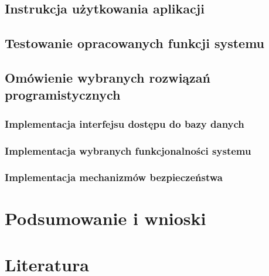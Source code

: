 \documentclass[12pt]{article}
\begin{document}
\subsection{Instrukcja użytkowania aplikacji}
\subsection{Testowanie opracowanych funkcji systemu}
\subsection{Omówienie wybranych rozwiązań programistycznych}
\subsubsection{Implementacja interfejsu dostępu do bazy danych}
\subsubsection{Implementacja wybranych funkcjonalności systemu}
\subsubsection{Implementacja mechanizmów bezpieczeństwa}


\section{Podsumowanie i wnioski}


\section{Literatura}



\end{document}
